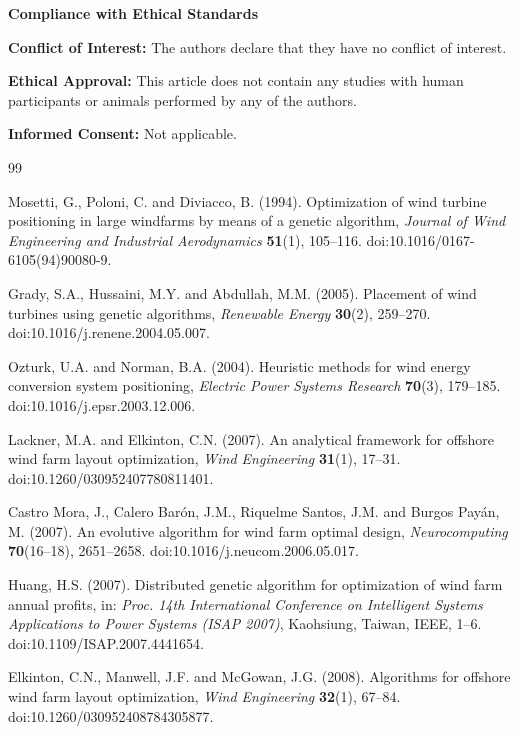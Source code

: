 \documentclass[journal,twoside]{IEEEtran}
\begin{document}
\vspace{1em}
\noindent\textbf{Compliance with Ethical Standards}

\vspace{0.5em}
\noindent\textbf{Conflict of Interest:} The authors declare that they have no conflict of interest.

\vspace{0.5em}
\noindent\textbf{Ethical Approval:} This article does not contain any studies with human participants or animals performed by any of the authors.

\vspace{0.5em}
\noindent\textbf{Informed Consent:} Not applicable.

\begin{thebibliography}{99}

Mosetti, G., Poloni, C. and Diviacco, B. (1994). Optimization of wind turbine positioning in large windfarms by means of a genetic algorithm, \textit{Journal of Wind Engineering and Industrial Aerodynamics} \textbf{51}(1), 105--116. doi:10.1016/0167-6105(94)90080-9.

Grady, S.A., Hussaini, M.Y. and Abdullah, M.M. (2005). Placement of wind turbines using genetic algorithms, \textit{Renewable Energy} \textbf{30}(2), 259--270. doi:10.1016/j.renene.2004.05.007.

Ozturk, U.A. and Norman, B.A. (2004). Heuristic methods for wind energy conversion system positioning, \textit{Electric Power Systems Research} \textbf{70}(3), 179--185. doi:10.1016/j.epsr.2003.12.006.

Lackner, M.A. and Elkinton, C.N. (2007). An analytical framework for offshore wind farm layout optimization, \textit{Wind Engineering} \textbf{31}(1), 17--31. doi:10.1260/030952407780811401.

Castro Mora, J., Calero Bar\'on, J.M., Riquelme Santos, J.M. and Burgos Pay\'an, M. (2007). An evolutive algorithm for wind farm optimal design, \textit{Neurocomputing} \textbf{70}(16--18), 2651--2658. doi:10.1016/j.neucom.2006.05.017.

Huang, H.S. (2007). Distributed genetic algorithm for optimization of wind farm annual profits, in: \textit{Proc. 14th International Conference on Intelligent Systems Applications to Power Systems (ISAP 2007)}, Kaohsiung, Taiwan, IEEE, 1--6. doi:10.1109/ISAP.2007.4441654.

Elkinton, C.N., Manwell, J.F. and McGowan, J.G. (2008). Algorithms for offshore wind farm layout optimization, \textit{Wind Engineering} \textbf{32}(1), 67--84. doi:10.1260/030952408784305877.


\end{thebibliography}
\end{document}
